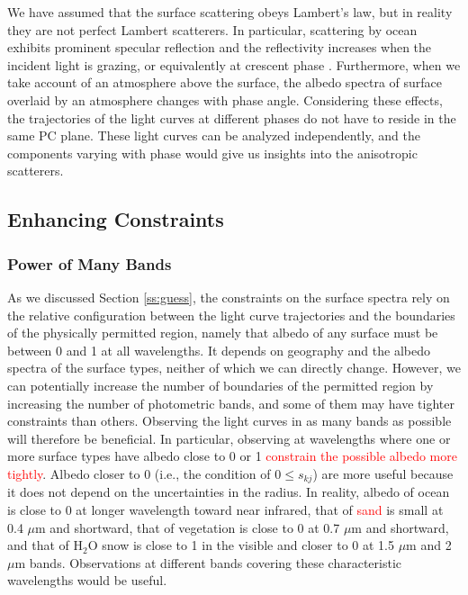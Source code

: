 \documentclass[iop,numberedappendix,apj]{emulateapj}
\def\edit#1{\textcolor{red}{#1}}
\def\memoYF#1{\color{red}[YF: {\bf #1}]\color{black}}
\begin{document}
We have assumed that the surface scattering obeys Lambert's law, but in reality they are not perfect Lambert scatterers. 
In particular, scattering by ocean exhibits prominent specular reflection and the reflectivity increases when the incident light is grazing, or equivalently at crescent phase \citep[e.g.,][]{Williams2008,Robinson2010,Robinson2014}. 
Furthermore, when we take account of an atmosphere above the surface, the albedo spectra of surface overlaid by an atmosphere changes with phase angle.  
Considering these effects, the trajectories of the light curves at different phases do not have to reside in the same PC plane. 
These light curves can be analyzed independently, and the components varying with phase would give us insights into the anisotropic scatterers. 




\subsection{Enhancing Constraints}
\label{ss:enhancing_constraints}


\subsubsection{Power of Many Bands}


As we discussed Section \ref{ss:guess}, the constraints on the surface spectra rely on the relative configuration between the light curve trajectories and the boundaries of the physically permitted region, namely that albedo of any surface must be between 0 and 1 at all wavelengths. 
It depends on geography and the albedo spectra of the surface types, neither of which we can directly change. 
However, we can potentially increase the number of boundaries of the permitted region by increasing the number of photometric bands, and some of them may have tighter constraints than others. 
Observing the light curves in as many bands as possible will therefore be beneficial.  
In particular, observing at wavelengths where one or more surface types have albedo close to 0 or 1 \edit{constrain the possible albedo more tightly}. 
Albedo closer to 0 (i.e., the condition of $0 \le s_{kj}$) are more useful because it does not depend on the uncertainties in the radius. 
In reality, albedo of ocean is close to 0 at longer wavelength toward near infrared, that of \edit{sand} is small at 0.4 $\mu $m and shortward, that of vegetation is close to 0 at 0.7 $\mu$m and shortward, and that of H$_2$O snow is close to 1 in the visible and closer to 0 at 1.5 $\mu$m and 2 $\mu$m bands. 
Observations at different bands covering these characteristic wavelengths would be useful. 
\end{document}
